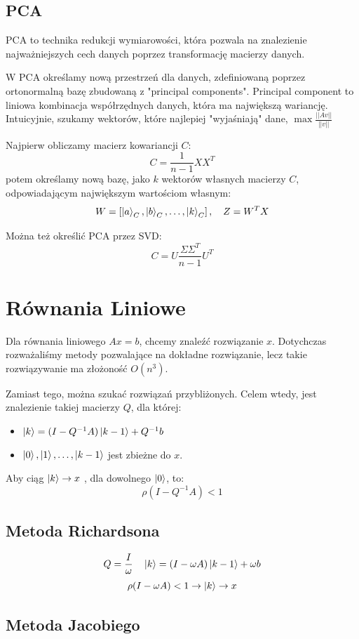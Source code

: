 \documentclass{../notatki}
\begin{document}
\subsection{PCA}

PCA to technika redukcji wymiarowości, która pozwala na znalezienie
najważniejszych cech danych poprzez transformację macierzy danych.

W PCA określamy nową przestrzeń dla danych, zdefiniowaną poprzez ortonormalną
bazę zbudowaną z "principal components". Principal component to
liniowa kombinacja współrzędnych danych, która ma największą wariancję.
Intuicyjnie, szukamy wektorów, które najlepiej "wyjaśniają" dane,
$\max \frac{||Av||}{||v||}$

Najpierw obliczamy macierz kowariancji $C$:
$$
C = \frac{1}{n-1} X X^T
$$
potem określamy nową bazę, jako $k$ wektorów własnych macierzy $C$,
odpowiadającym największym wartościom własnym:
$$
W = \left[\ket{a}_C, \ket{b}_C, \dots, \ket{k}_C\right], \quad Z = W^TX
$$

Można też określić PCA przez SVD:
$$
C = U \frac{\Sigma\Sigma^T}{n-1} U^T
$$

\section{Równania Liniowe}

Dla równania liniowego $Ax = b$, chcemy znaleźć rozwiązanie $x$.
Dotychczas rozważaliśmy metody pozwalające na dokładne rozwiązanie, lecz
takie rozwiązywanie ma złożoność $O(n^3)$.

Zamiast tego, można szukać rozwiązań przybliżonych. Celem wtedy, jest
znalezienie
takiej macierzy $Q$, dla której:
\begin{itemize}
  \item $\ket{k} = (I - Q^{-1}A) \ket{k - 1} + Q^{-1}b$
  \item $\ket{0}, \ket{1}, \dots, \ket{k - 1}$ jest zbieżne do $x$.
\end{itemize}
Aby ciąg $\ket{k} \to x$ , dla dowolnego $\ket{0}$, to:
$$
\rho(I - Q^{-1}A) < 1
$$

\subsection{Metoda Richardsona}

$$
Q = \frac{I}{\omega} \quad \ket{k} = (I - \omega A) \ket{k - 1} + \omega b
$$
$$
\rho(I - \omega A) < 1 \rightarrow \ket{k} \to x
$$

\subsection{Metoda Jacobiego}
\end{document}
